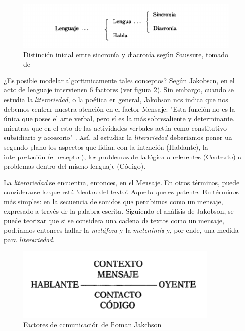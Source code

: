 \documentclass[12pt,letterpaper,twoside]{article}
\begin{document}
\begin{figure}[htbp]
\centering
\includegraphics[width=.9\linewidth]{./assets/clasificacion_saussure.png}
\caption{\label{fig:org9cc6cd5}Distinción inicial entre sincronía y diacronía según Saussure, tomado de \cite{alonso1945curso}}
\end{figure}

¿Es posible modelar algorítmicamente tales conceptos? Según Jakobson,
en el acto de lenguaje intervienen 6 factores (ver figura
\ref{fig:org599727c}). Sin embargo, cuando se estudia la \emph{literariedad},
o la poética en general, Jakobson nos indica que nos debemos centrar
nuestra atención en el factor Mensaje: "Esta función no es la única
que posee el arte verbal, pero sí es la más sobresaliente y
determinante, mientras que en el esto de las actividades verbales
actúa como constitutivo subsidiario y accesorio" \cite{jakobson1981linguistica}.
Así, al estudiar la \emph{literariedad} deberiamos poner un segundo plano
los aspectos que lidian con la intención (Hablante), la interpretación
(el receptor), los problemas de la lógica o referentes (Contexto) o
problemas dentro del mismo lenguaje (Código). 

La \emph{literariedad} se encuentra, entonces, en el Mensaje. En otros
términos, puede considerarse lo que está 'dentro del texto'. Aquello
que es patente.  En términos más simples: en la secuencia de sonidos
que percibimos como un mensaje, expresado a través de la palabra
escrita. Siguiendo el análisis de Jakobson, se puede teorizar que
si se considera una cadena de textos como un mensaje, podríamos
entonces hallar la \emph{metáfora} y la \emph{metonimia} y, por ende,
una medida para \emph{literariedad}.


\begin{figure}[htbp]
\centering
\includegraphics[width=.9\linewidth]{./assets/factores_comunicacion.png}
\caption{\label{fig:org599727c}Factores de comunicación de Roman Jakobson \cite{jakobson1981linguistica}}
\end{figure}
\end{document}
